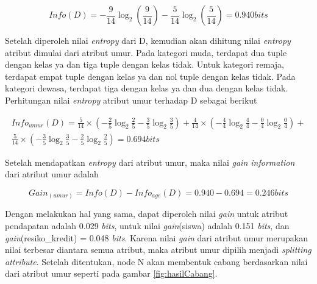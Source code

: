 \begin{displaymath}
	Info(D) = - \frac{9}{14}\log_2(\frac{9}{14}) - \frac{5}{14}\log_2(\frac{5}{14}) = 0.940 bits
\end{displaymath}

Setelah diperoleh nilai \textsl{entropy} dari D, kemudian akan dihitung nilai \textsl{entropy} atribut dimulai dari atribut umur. Pada kategori muda, terdapat dua tuple dengan kelas ya dan tiga tuple dengan kelas tidak. Untuk kategori remaja, terdapat empat tuple dengan kelas ya dan nol tuple dengan kelas tidak. Pada kategori dewasa, terdapat tiga dengan kelas ya dan dua dengan kelas tidak. Perhitungan nilai \textsl{entropy} atribut umur terhadap D sebagai berikut

\begin{align*}
	Info_{umur}(D) = \frac{5}{14} \times (-\frac{2}{5}\log_2\frac{2}{5} - \frac{3}{5}\log_2\frac{3}{5}) + \frac{4}{14} \times (-\frac{4}{4}\log_2\frac{4}{4} - \frac{0}{4}\log_2\frac{0}{4}) + \\
	\frac{5}{14} \times (-\frac{3}{5}\log_2\frac{3}{5} - \frac{2}{5}\log_2\frac{2}{5}) = 0.694 bits
\end{align*}

Setelah mendapatkan \textsl{entropy} dari atribut umur, maka nilai \textsl{gain information} dari atribut umur adalah

\begin{displaymath}
	Gain_{(umur)} = Info(D) - Info_{age}(D) = 0.940 - 0.694 = 0.246 bits
\end{displaymath}

Dengan melakukan hal yang sama, dapat diperoleh nilai \textsl{gain} untuk atribut pendapatan adalah 0.029 \textsl{bits}, untuk nilai \textsl{gain}(siswa) adalah 0.151 \textsl{bits}, dan \textsl{gain}(resiko\_kredit) = 0.048 \textsl{bits}. Karena nilai \textsl{gain} dari atribut umur merupakan nilai terbesar diantara semua atribut, maka atribut umur dipilih menjadi \textsl{splitting attribute}. Setelah ditentukan, node N akan membentuk cabang berdasarkan nilai dari atribut umur seperti pada gambar \ref{fig:hasilCabang}.

